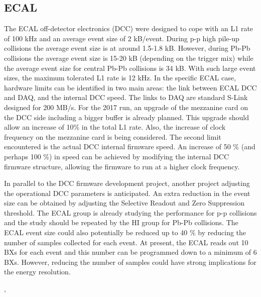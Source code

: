 \subsection{ECAL\label{subsec:ECAL}} 
The ECAL off-detector electronics (DCC) were designed to cope with an L1 rate of 100 kHz and an average event size of 2 kB/event. 
During p-p high pile-up collisions the average event size is at around 1.5-1.8 kB. However, during Pb-Pb collisions the average event size is 15-20 kB (depending on the trigger mix) while the
average event size for central Pb-Pb collisions is 34 kB. With such large event sizes, the maximum tolerated L1 rate is
12 kHz. In the specific ECAL case, hardware limits can be identified in two main areas: the link between ECAL DCC and
DAQ, and the internal DCC speed. The links to DAQ are standard S-Link designed for 200 MB/s. For the 2017 run, an
upgrade of the mezzanine card on the DCC side including a bigger buffer is already planned. This upgrade should allow an
increase of 10\% in the total L1 rate. Also, the increase of clock frequency on the mezzanine card is being considered.
The second limit encountered is the actual DCC internal firmware speed. An increase of 50 \% (and perhaps 100 \%) in
speed can be achieved by modifying the internal DCC firmware structure, allowing the firmware to run at a higher clock
frequency.

In parallel to the DCC firmware development project, another project adjusting the operational DCC parameters is
anticipated. An extra reduction in the event size can be obtained by adjusting the Selective Readout and Zero
Suppression threshold. The ECAL group is already studying the performance for p-p collisions and the study should be
repeated by the HI group for Pb-Pb collisions. The ECAL event size could also potentially be reduced up to 40 \% by
reducing the number of samples collected for each event. At present, the ECAL reads out 10 BXs for each event and this
number can be programmed down to a minimum of 6 BXs. However, reducing the number of samples could have strong
implications for the energy resolution. 

\cite{ECALDPG}, \cite{ECALHIN}




